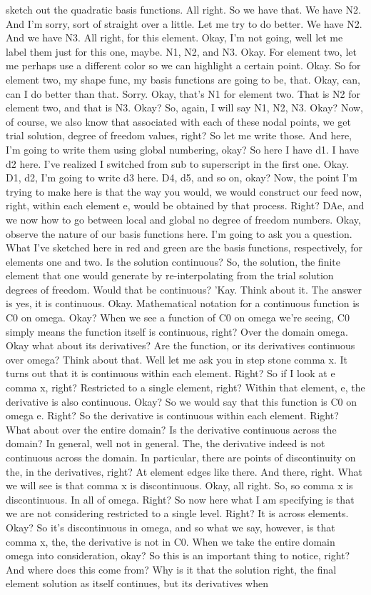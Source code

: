 \documentclass[10pt]{article}
\begin{document}
{sketch out the quadratic basis functions. All right. So we have that. We have N2. And I'm sorry, sort of straight over a little. Let me try to do better.  We have N2. And we have N3. All right, for this element. Okay, I'm not going, well let me label them just for this one, maybe. N1, N2, and N3. Okay. For element two, let me perhaps use a different color so we can highlight a certain point. Okay. So for element two, my shape func, my basis functions are going to be, that. Okay, can, can I do better than that. Sorry. Okay, that's N1 for element two. That is N2 for element two, and that is N3. Okay? So, again, I will say N1, N2, N3. Okay? Now, of course, we also know that associated with each of these nodal points, we get trial solution, degree of freedom values, right? So let me write those. And here, I'm going to write them using global numbering, okay? So here I have d1. I have d2 here. I've realized I switched from sub to superscript in the first one. Okay. D1, d2, I'm going to write d3 here. D4, d5, and so on, okay? Now, the point I'm trying to make here is that the way you would, we would construct our feed now, right, within each element e, would be obtained by that process. Right? DAe, and we now how to go between local and global no degree of freedom numbers. Okay, observe the nature of our basis functions here. I'm going to ask you a question. What I've sketched here in red and green are the basis functions, respectively, for elements one and two. Is the solution continuous? So, the solution, the finite element that one would generate by re-interpolating from the trial solution degrees of freedom. Would that be continuous? 'Kay. Think about it. The answer is yes, it is continuous. Okay. Mathematical notation for a continuous function is C0 on omega. Okay? When we see a function of C0 on omega we're seeing, C0 simply means the function itself is continuous, right? Over the domain omega. Okay what about its derivatives? Are the function, or its derivatives continuous over omega? Think about that. Well let me ask you in step stone comma x. It turns out that it is continuous within each element. Right? So if I look at e comma x, right? Restricted to a single element, right? Within that element, e, the derivative is also continuous. Okay? So we would say that this function is C0 on omega e. Right? So the derivative is continuous within each element. Right? What about over the entire domain? Is the derivative continuous across the domain? In general, well not in general. The, the derivative indeed is not continuous across the domain. In particular, there are points of discontinuity on the, in the derivatives, right? At element edges like there. And there, right. What we will see is that comma x is discontinuous. Okay, all right. So, so comma x is discontinuous. In all of omega. Right? So now here what I am specifying is that we are not considering restricted to a single level. Right? It is across elements. Okay? So it's discontinuous in omega, and so what we say, however, is that comma x, the, the derivative is not in C0. When we take the entire domain omega into consideration, okay? So this is an important thing to notice, right? And where does this come from? Why is it that the solution right, the final element solution as itself continues, but its derivatives when }
\end{document}
